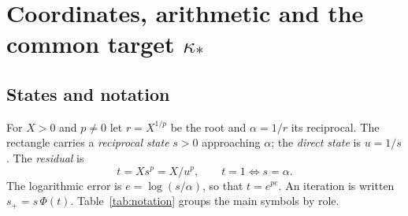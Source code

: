 \documentclass[10pt,a4paper]{article}
\theoremstyle{plain}
\theoremstyle{remark}
\numberwithin{equation}{section}
\begin{document}
\section{Coordinates, arithmetic and the common target $\kappa_*$}\label{sec:coords}

\subsection{States and notation}

For $X>0$ and $p\neq 0$ let $r=X^{1/p}$ be the root and $\alpha=1/r$ its reciprocal. The rectangle
carries a \emph{reciprocal state} $s>0$ approaching $\alpha$; the \emph{direct state} is $u=1/s$. The
\emph{residual} is
\[ t=Xs^{p}=X/u^{p}, \qquad t=1 \iff s=\alpha . \]
The logarithmic error is $e=\log(s/\alpha)$, so that $t=e^{pe}$. An iteration is written
$s_+=s\,\Phi(t)$. Table~\ref{tab:notation} groups the main symbols by role.
\end{document}
